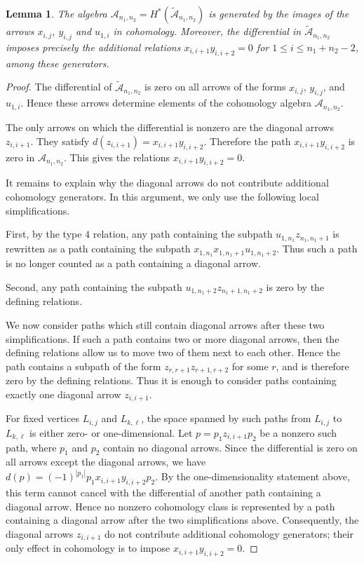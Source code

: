 \documentclass[a4paper, reqno, 11pt]{amsart}
\newtheorem{lemma}[theorem]{Lemma}
\theoremstyle{definition}
\begin{document}
\begin{lemma}\label{lem:cohomology-generators}
	The algebra \(\mathcal{A}_{n_1,n_2}=H^\ast(\widetilde{\mathcal{A}}_{n_1,n_2})\)
	is generated by the images of the arrows $x_{i,j}$, $y_{i,j}$ and $u_{1,i}$ in cohomology.  Moreover, the differential in
	\(\widetilde{\mathcal{A}}_{n_1,n_2}\) imposes precisely the additional relations $x_{i,i+1}y_{i,i+2}=0$ for $1\leq i\leq n_1+n_2-2$, among these generators.
\end{lemma}

\begin{proof}
	The differential of \(\widetilde{\mathcal{A}}_{n_1,n_2}\) is zero on all
	arrows of the forms \(x_{i,j}\), \(y_{i,j}\), and \(u_{1,i}\).  Hence these
	arrows determine elements of the cohomology algebra
	\(\mathcal{A}_{n_1,n_2}\).
	
	The only arrows on which the differential is nonzero are the diagonal arrows
	\(z_{i,i+1}\).  They satisfy
	\(
	d(z_{i,i+1})=x_{i,i+1}y_{i,i+2}.
	\)
	Therefore the path \(x_{i,i+1}y_{i,i+2}\) is zero in
	\(\mathcal{A}_{n_1,n_2}\).  This gives the relations
	\(
	x_{i,i+1}y_{i,i+2}=0.
	\)
	
	It remains to explain why the diagonal arrows do not contribute additional cohomology generators. In this argument, we only use the following local simplifications. 
	
	First, by the type \(4\) relation, any path containing the subpath \(u_{1,n_1}z_{n_1,n_1+1}\) is rewritten as a path containing the subpath \(x_{1,n_1}x_{1,n_1+1}u_{1,n_1+2}.\) Thus such a path is no longer counted as a path containing a diagonal arrow.
	
	Second, any path containing the subpath \(u_{1,n_1+2}z_{n_1+1,n_1+2}\) is zero by the defining relations.
	
	We now consider paths which still contain diagonal arrows after these two
	simplifications. If such a path contains two or more diagonal arrows, then the
	defining relations allow us to move two of them next to each other. Hence the
	path contains a subpath of the form \(z_{r,r+1}z_{r+1,r+2}\)
	for some \(r\), and is therefore zero by the defining relations. Thus it is
	enough to consider paths containing exactly one diagonal arrow \(z_{i,i+1}\).
	
	For fixed vertices \(L_{i,j}\) and \(L_{k,\ell}\), the space spanned by such paths
	from \(L_{i,j}\) to \(L_{k,\ell}\) is either zero- or one-dimensional. Let \(p=p_1z_{i,i+1}p_2\) be a nonzero such path, where \(p_1\) and \(p_2\) contain no diagonal arrows. Since the differential is zero on all arrows except the diagonal arrows, we have \(d(p)=(-1)^{|p_1|} p_1x_{i,i+1}y_{i,i+2}p_2.\) By the one-dimensionality statement above, this term cannot cancel with the
	differential of another path containing a diagonal arrow. Hence no nonzero
	cohomology class is represented by a path containing a diagonal arrow after the
	two simplifications above. Consequently, the diagonal arrows \(z_{i,i+1}\) do
	not contribute additional cohomology generators; their only effect in
	cohomology is to impose $x_{i,i+1}y_{i,i+2}=0.$
\end{proof}
\end{document}
